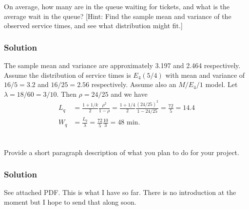 \documentclass[letterpaper]{amsart}
\begin{document}
On average, how many are in the queue waiting for tickets, and what is the
average wait in the queue? [Hint: Find the sample mean and variance of
the observed service times, and see what distribution might fit.]
\subsubsection*{Solution}
The sample mean and variance are approximately 3.197 and 2.464 respectively.
Assume the distribution of service times is $E_4(5/4)$ with mean and
variance of $16/5=3.2$ and $16/25=2.56$ respectively.
Assume also an $M/E_4/1$ model.
Let $\lambda=18/60=3/10$.
Then $\rho = 24/25$ and we have
\begin{align*}
  L_q &= \frac{1+1/k}{2}\frac{\rho^2}{1-\rho}
        = \frac{1+1/4}{2}\frac{(24/25)^2}{1-24/25}
  = \frac{72}{5} = 14.4\\
  W_q &= \frac{L_q}{\lambda} = \frac{72}{5}  \frac{10}{3}= 48\text{ min}.
\end{align*}

\section{} %
Provide a short paragraph description of what you plan to do for your project.
\subsubsection*{Solution}
See attached PDF. This is what I have so far. There is no introduction at the
moment but I hope to send that along soon.
\end{document}
